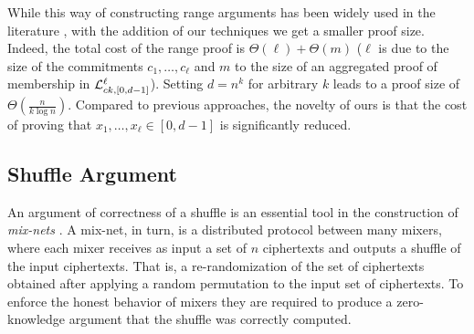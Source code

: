 While this way of constructing range arguments has been widely used in the literature \cite{AC:CamChaShe08,PAIRING:RiaKohPre09}, with the addition of our techniques we get a smaller proof size. Indeed, the total cost of the range proof is $\Theta(\ell)+\Theta(m)$ ($\ell$ is due to the size of the commitments $c_1,\ldots,c_\ell$ and $m$ to the size of an aggregated proof of membership in $\mathcal{L}_{ck,[0,d-1]}^\ell$).  Setting $d=n^{k}$ for arbitrary $k$ leads to a proof size of $\Theta(\frac{n}{k \log n})$. Compared to previous approaches, the novelty of ours is that the cost of proving that $x_1,\ldots,x_\ell\in[0,d-1]$ is significantly reduced.

\subsection{Shuffle Argument}
An argument of correctness of a shuffle is an essential tool in the construction of \emph{mix-nets} \cite{CACM:Chaum81}. A mix-net, in turn, is a distributed protocol between many {mixers}, where each mixer receives as input a set of $n$ ciphertexts and  outputs a {shuffle} of the input ciphertexts. That is, a {re-randomization} of the set of ciphertexts obtained after applying a {random permutation} to the input set of ciphertexts. To enforce the honest behavior of mixers they are required to produce a zero-knowledge argument that the shuffle was correctly computed.  

